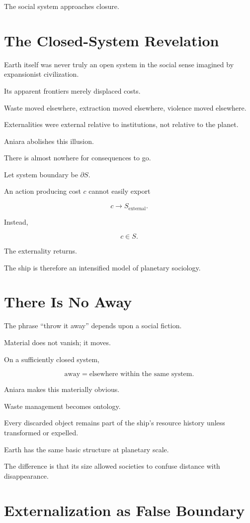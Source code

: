 \documentclass[11pt,oneside]{book}
\theoremstyle{definition}
\theoremstyle{remark}
\begin{document}
The social system approaches closure.

\section{The Closed-System Revelation}

Earth itself was never truly an open system in the social sense imagined by expansionist civilization.

Its apparent frontiers merely displaced costs.

Waste moved elsewhere, extraction moved elsewhere, violence moved elsewhere.

Externalities were external relative to institutions, not relative to the planet.

Aniara abolishes this illusion.

There is almost nowhere for consequences to go.

Let system boundary be \(\partial S\).

An action producing cost \(c\) cannot easily export

\[
c\rightarrow S_{\mathrm{external}}.
\]

Instead,

\[
c\in S.
\]

The externality returns.

The ship is therefore an intensified model of planetary sociology.

\section{There Is No Away}

The phrase ``throw it away'' depends upon a social fiction.

Material does not vanish; it moves.

On a sufficiently closed system,

\[
\text{away}
=
\text{elsewhere within the same system}.
\]

Aniara makes this materially obvious.

Waste management becomes ontology.

Every discarded object remains part of the ship's resource history unless transformed or expelled.

Earth has the same basic structure at planetary scale.

The difference is that its size allowed societies to confuse distance with disappearance.

\section{Externalization as False Boundary}
\end{document}
